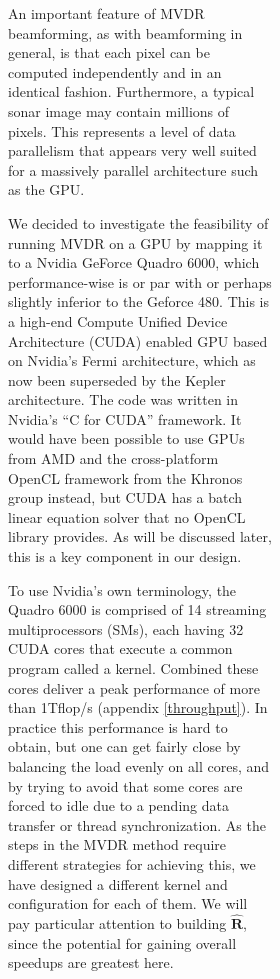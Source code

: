 \documentclass[12pt,journal,draftclsnofoot,onecolumn]{IEEEtran}
\newcommand\mat[1]{\boldsymbol{#1}}
\newcommand\1{\vec 1}
\newcommand*\eR{\mat{\hat R}}
\begin{document}
\begin{figure}[H]
\begin{figure}[!t]
\begin{figure}[!t]

An important feature of MVDR beamforming, as with beamforming in general, is that each pixel can be computed independently and in an identical fashion. Furthermore, a typical sonar image may contain millions of pixels. This represents a level of data parallelism that appears very well suited for a massively parallel architecture such as the GPU.

We decided to investigate the feasibility of running MVDR on a GPU by mapping it to a Nvidia GeForce Quadro 6000, which performance-wise is or par with or perhaps slightly inferior to the Geforce 480. This is a high-end Compute Unified Device Architecture (CUDA) enabled GPU based on Nvidia's Fermi architecture, which as now been superseded by the Kepler architecture. The code was written in Nvidia's ``C for CUDA'' framework. It would have been possible to use GPUs from AMD and the cross-platform OpenCL framework from the Khronos group instead, but CUDA has a batch linear equation solver that no OpenCL library provides. As will be discussed later, this is a key component in our design.

To use Nvidia's own terminology, the Quadro 6000 is comprised of 14 streaming multiprocessors (SMs), each having 32 CUDA cores that execute a common program called a kernel. Combined these cores deliver a peak performance of more than 1\;Tflop/s (appendix \ref{throughput}). In practice this performance is hard to obtain, but one can get fairly close by balancing the load evenly on all cores, and by trying to avoid that some cores are forced to idle due to a pending data transfer or thread synchronization. As the steps in the MVDR method require different strategies for achieving this, we have designed a different kernel and configuration for each of them. We will pay particular attention to building $\eR$, since the potential for gaining overall speedups are greatest here.



\end{figure}
\end{figure}
\end{figure}
\end{document}
